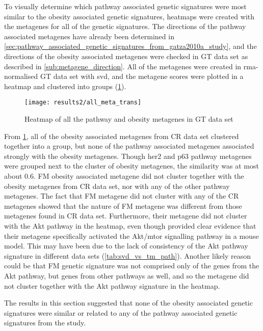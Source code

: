 \noindent
To visually determine which pathway associated genetic signatures were most similar to the obesity associated genetic signatures, heatmaps were created with the metagenes for all of the genetic signatures.
The directions of the pathway associated metagenes have already been determined in \cref{sec:pathway_associated_genetic_signatures_from_gatza2010a_study}, and the directions of the obesity associated metagenes were checked in GT data set as described in \cref{sub:metagene_direction}.
All of the metagenes were created in \gls{rma}-normalised GT data set with \gls{svd}, and the metagene scores were plotted in a heatmap and clustered into groups (\cref{fig:gatza_allmeta}).

\begin{figure}[htpb]
	\centering
	\texttt{[image: results2/all\_meta\_trans]}
	\caption{Heatmap of all the pathway and obesity metagenes in GT data set}
	\label{fig:gatza_allmeta}
\end{figure}

From \cref{fig:gatza_allmeta}, all of the obesity associated metagenes from CR data set clustered together into a group, but none of the pathway associated metagenes associated strongly with the obesity metagenes.
Though \gls{her2} and p63 pathway metagenes were grouped next to the cluster of obesity metagenes, the similarity was at most about 0.6.
FM obesity associated metagene did not cluster together with the obesity metagenes from CR data set, nor with any of the other pathway metagenes.
The fact that FM metagene did not cluster with any of the CR metagenes showed that the nature of FM metagene was different from those metagenes found in CR data set.
Furthermore, their metagene did not cluster with the Akt pathway in the heatmap, even though \citet{Fuentes-Mattei2014} provided clear evidence that their metagene specifically activated the Akt/\gls{mtor} signalling pathway in a mouse model.
This may have been due to the lack of consistency of the Akt pathway signature in different data sets (\cref{tab:svd_vs_tm_path}).
Another likely reason could be that FM genetic signature was not comprised only of the genes from the Akt pathway, but genes from other pathways as well, and so the metagene did not cluster together with the Akt pathway signature in the heatmap.

The results in this section suggested that none of the obesity associated genetic signatures were similar or related to any of the pathway associated genetic signatures from the \citet{Gatza2010a} study.


